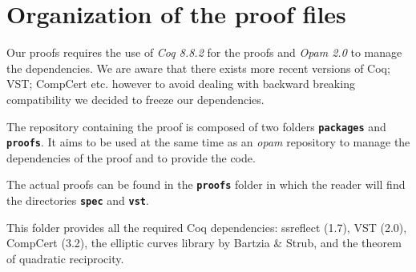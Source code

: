 \section{Organization of the proof files}
\label{appendix:proof-folders}

Our proofs requires the use of \emph{Coq 8.8.2} for the proofs and
\emph{Opam 2.0} to manage the dependencies. We are aware that there exists more
recent versions of Coq; VST; CompCert etc. however to avoid dealing with backward
breaking compatibility we decided to freeze our dependencies.

The repository containing the proof is composed of two folders \textbf{\texttt{packages}}
and \textbf{\texttt{proofs}}.
It aims to be used at the same time as an \emph{opam} repository to manage
the dependencies of the proof and to provide the code.

The actual proofs can be found in the \textbf{\texttt{proofs}} folder in which
the reader will find the directories \textbf{\texttt{spec}} and \textbf{\texttt{vst}}.

This folder provides all the required Coq dependencies: ssreflect (1.7), 
VST (2.0), CompCert (3.2), the elliptic curves library by Bartzia \& Strub,
and the theorem of quadratic reciprocity.

